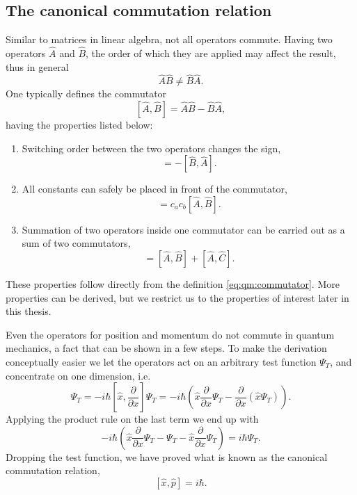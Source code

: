 \subsection{The canonical commutation relation}
\label{sec:qm:commutator}
Similar to matrices in linear algebra, not all operators commute.
Having two operators $\hat{A}$ and $\hat{B}$, the order of which they are applied may affect the result, thus in general
\begin{equation}
\hat{A}\hat{B} \neq \hat{B}\hat{A} .
\end{equation}
One typically defines the commutator
\begin{equation}
\label{eq:qm:commutator}
[\hat{A}, \hat{B}] = \hat{A}\hat{B} - \hat{B}\hat{A} ,
\end{equation}
having the properties listed below:
\begin{enumerate}[{\bf a. }]
\item Switching order between the two operators changes the sign,
\begin{equation}
[\hat{A}, \hat{B}] = - [\hat{B}, \hat{A}] .
\end{equation}
\item All constants can safely be placed in front of the commutator, 
\begin{equation}
[c_a \hat{A}, c_b\hat{B}] = c_a c_b [\hat{A}, \hat{B}] .
\end{equation}
\item Summation of two operators inside one commutator can be carried out as a sum of two commutators,
\begin{equation}
[\hat{A}, \hat{B} + \hat{C}] = [\hat{A}, \hat{B}] + [\hat{A}, \hat{C}] .
\end{equation}
\end{enumerate}
These properties follow directly from the definition \eqref{eq:qm:commutator}. 
More properties can be derived, but we restrict us to the properties of interest later in this thesis.

Even the operators for position and momentum do not commute in quantum mechanics, a fact that can be shown in a few steps.
To make the derivation conceptually easier we let the operators act on an arbitrary test function $\Psi_T$, and concentrate on one dimension, i.e.
\begin{equation}
[\hat{x}, \hat{p}] \Psi_T = -i\hbar [\hat{x}, \frac{\partial}{\partial x}] \Psi_T 
= -i \hbar \left( \hat{x} \frac{\partial}{\partial x} \Psi_T - \frac{\partial}{\partial x}\left(\hat{x} \Psi_T \right) \right) .
\end{equation}
Applying the product rule on the last term we end up with
\begin{equation}
-i \hbar \left( \hat{x} \frac{\partial}{\partial x} \Psi_T - \Psi_T 
- \hat{x} \frac{\partial}{\partial x} \Psi_T \right)
= i\hbar \Psi_T .
\end{equation}
Dropping the test function, we have proved what is known as the canonical commutation relation,
\begin{equation}
\label{eq:qm:canonicalcommutation}
[\hat{x}, \hat{p}] = i\hbar .
\end{equation}



